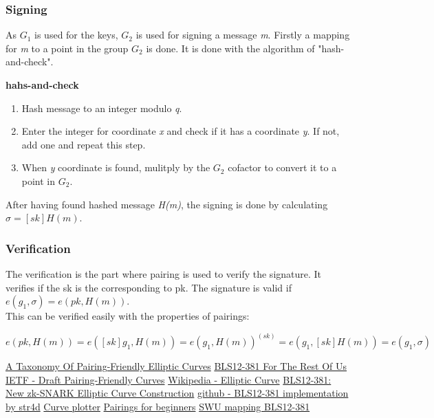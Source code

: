 \documentclass{article}
\begin{document}
\subsubsection{Signing}
As \(G_1\) is used for the keys, \(G_2\) is used for signing a message \textit{m}. Firstly a mapping for \textit{m} to a point in the group \(G_2\) is done. It is done with the algorithm of "hash-and-check". \\
\begin{center}
\textbf{hahs-and-check}
\begin{enumerate}
    \item Hash message to an integer modulo \textit{q}.
    \item Enter the integer for coordinate \textit{x} and check if it has a coordinate \textit{y}. If not, add one and repeat this step.
    \item When \textit{y} coordinate is found, mulitply by the \(G_2\) cofactor to convert it to a point in \(G_2\).
\end{enumerate}
\end{center}
After having found hashed message \textit{H(m)}, the signing is done by calculating \(\sigma = [sk]H(m)\).

\subsubsection{Verification}
The verification is the part where pairing is used to verify the signature. It verifies if the sk is the corresponding to pk. The signature is valid if \(e(g_1,\sigma)= e(pk,H(m))\). \\
This can be verified easily with the properties of pairings:
\begin{center}
    \(e(pk,H(m)) = e([sk]g_1,H(m))= e(g_1,H(m))^{(sk)} = e(g_1,[sk]H(m)) = e(g_1,\sigma)\)
\end{center}






\href{https://eprint.iacr.org/2006/372.pdf}{A Taxonomy Of Pairing-Friendly Elliptic Curves}
\href{https://hackmd.io/@benjaminion/bls12-381}{BLS12-381 For The Rest Of Us}
\href{https://datatracker.ietf.org/doc/html/draft-irtf-cfrg-pairing-friendly-curves-02#name-bls-curves}{IETF - Draft Pairing-Friendly Curves}
\href{https://en.wikipedia.org/wiki/Elliptic_curve}{Wikipedia - Elliptic Curve}
\href{https://electriccoin.co/blog/new-snark-curve/}{BLS12-381: New zk-SNARK Elliptic Curve Construction}
\href{https://github.com/zcash/librustzcash/blob/6e0364cd42a2b3d2b958a54771ef51a8db79dd29/pairing/src/bls12_381/README.md#generators}{github - BLS12-381 implementation by str4d}
\href{https://www.desmos.com/calculator?lang=de}{Curve plotter}
\href{https://static1.squarespace.com/static/5fdbb09f31d71c1227082339/t/5ff394720493bd28278889c6/1609798774687/PairingsForBeginners.pdf}{Pairings for beginners}
\href{https://datatracker.ietf.org/doc/html/draft-irtf-cfrg-hash-to-curve-16#section-5.3.1}{}
\href{https://eprint.iacr.org/2019/403.pdf}{SWU mapping BLS12-381}
\end{document}
